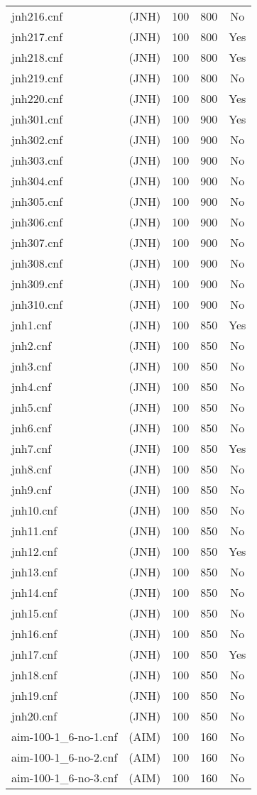 \begin{supertabular}{|lc|rr|c|}
jnh216.cnf&(JNH)&100&800&No\\
jnh217.cnf&(JNH)&100&800&Yes\\
jnh218.cnf&(JNH)&100&800&Yes\\
jnh219.cnf&(JNH)&100&800&No\\
jnh220.cnf&(JNH)&100&800&Yes\\
jnh301.cnf&(JNH)&100&900&Yes\\
jnh302.cnf&(JNH)&100&900&No\\
jnh303.cnf&(JNH)&100&900&No\\
jnh304.cnf&(JNH)&100&900&No\\
jnh305.cnf&(JNH)&100&900&No\\
jnh306.cnf&(JNH)&100&900&No\\
jnh307.cnf&(JNH)&100&900&No\\
jnh308.cnf&(JNH)&100&900&No\\
jnh309.cnf&(JNH)&100&900&No\\
jnh310.cnf&(JNH)&100&900&No\\
jnh1.cnf&(JNH)&100&850&Yes\\
jnh2.cnf&(JNH)&100&850&No\\
jnh3.cnf&(JNH)&100&850&No\\
jnh4.cnf&(JNH)&100&850&No\\
jnh5.cnf&(JNH)&100&850&No\\
jnh6.cnf&(JNH)&100&850&No\\
jnh7.cnf&(JNH)&100&850&Yes\\
jnh8.cnf&(JNH)&100&850&No\\
jnh9.cnf&(JNH)&100&850&No\\
jnh10.cnf&(JNH)&100&850&No\\
jnh11.cnf&(JNH)&100&850&No\\
jnh12.cnf&(JNH)&100&850&Yes\\
jnh13.cnf&(JNH)&100&850&No\\
jnh14.cnf&(JNH)&100&850&No\\
jnh15.cnf&(JNH)&100&850&No\\
jnh16.cnf&(JNH)&100&850&No\\
jnh17.cnf&(JNH)&100&850&Yes\\
jnh18.cnf&(JNH)&100&850&No\\
jnh19.cnf&(JNH)&100&850&No\\
jnh20.cnf&(JNH)&100&850&No\\
aim-100-1\_6-no-1.cnf&(AIM)&100&160   &No\\ 
aim-100-1\_6-no-2.cnf&(AIM)&100&160 &No\\ 
aim-100-1\_6-no-3.cnf&(AIM)&100&160 &No\\ 

\end{supertabular}
